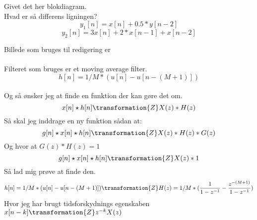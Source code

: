 
\begin{Øvelser}
    \begin{kapitel}[Introduktion]
        \begin{Øvelse}[Blokdiagrammer]
            Givet det her blokdiagram. 
            \\
            Hvad er så differens ligningen? 
            \[y_1[n] = x[n] + 0.5 * y[n-2]\] 
            \[y_2[n] = 3x[n] + 2*x[n-1] + x[n - 2]\]
        \end{Øvelse}
    \end{kapitel}
    \begin{kapitel}        
    \end{kapitel}
    \begin{kapitel}[Z domænet]
        \begin{Øvelse}
            Billede som bruges til redigering er \\
            \\
            Filteret som bruges er et moving average filter. 
            \[h[n] = 1/M * (u[n] - u[n - (M+1)])\]
            \\
            Og så ønsker jeg at finde en funktion der kan gøre det om. 
            \[x[n]\star h[n] \transformation{Z} X(z)*H(z)\]
            Så skal jeg inddrage en ny funktion sådan at: 
            \[g[n]\star x[n]\star h[n] \transformation{Z} X(z)*H(z)*G(z)\]
            Og hvor at $G(z)*H(z) = 1$
            \[g[n]\star x[n]\star h[n] \transformation{Z} X(z)*1\]
            Så lad mig prøve at finde den. \\
            \[h[n] = 1/M * (u[n] - u[n - (M+1)]) \transformation{Z} H(z) = 1/M * (\frac{1}{1 - z^{-1}} - \frac{z^{-(M+1)}}{1 - z^{-1}})\]
            Hvor jeg har brugt tidsforskydnings egenskaben $x[n-k] \transformation{Z}  z^{-k}X(z)$\\


\end{Øvelse}
\end{kapitel}
\end{Øvelser}

